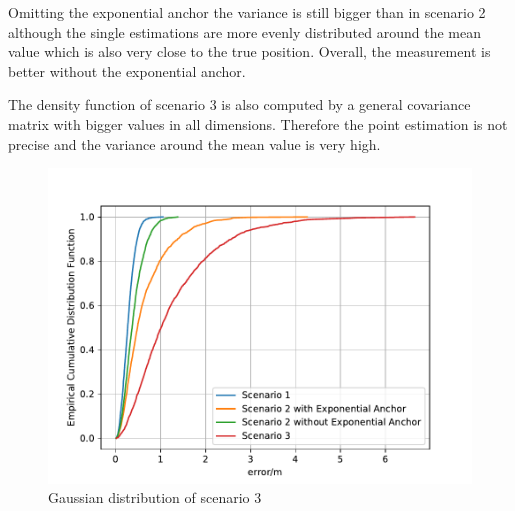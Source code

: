 \documentclass{article}
\begin{document}
\begin{itemize}
        Omitting the exponential anchor the variance is still bigger than in scenario 2 although the single estimations are more evenly distributed around the mean value which is also very close to the true position. Overall, the measurement is better without the exponential anchor.
        
	    \begin{figure}[hbt!]
        \begin{floatrow}
		\end{floatrow}
		\end{figure}
	
        The density function of scenario 3 is also computed by a general covariance matrix with bigger values in all dimensions. Therefore the point estimation is not precise and the variance around the mean value is very high.
        
        \newpage
        
        \begin{figure}[hbt!]
            \centering
            \includegraphics[width=\textwidth]{./Figures/All_ecdf_ls.pdf}
            \caption{Gaussian distribution of scenario 3}
            \label{fig:All_ecdf_ls}
        \end{figure}
        

\end{itemize}
\end{document}
